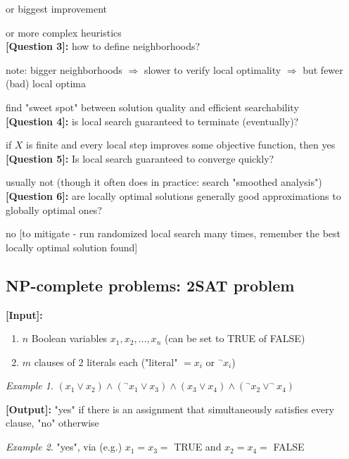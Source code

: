 \documentclass[a4paper,12pt]{article}
\theoremstyle{plain}
\theoremstyle{definition}
\theoremstyle{remark}
\newtheorem*{example}{Example}
\begin{document}
or biggest improvement

or more complex heuristics
\\

\textbf{[Question 3]:} how to define neighborhoods?

note: bigger neighborhoods $\Rightarrow$ slower to verify local optimality $\Rightarrow$ but fewer (bad) local optima

find "sweet spot" between solution quality and efficient searchability
\\

\textbf{[Question 4]:} is local search guaranteed to terminate (eventually)?

if $X$ is finite and every local step improves some objective function, then yes
\\

\textbf{[Question 5]:} Is local search guaranteed to converge quickly?

usually not (though it often does in practice: search "smoothed analysis")
\\

\textbf{[Question 6]:} are locally optimal solutions generally good approximations to globally optimal ones?

no [to mitigate - run randomized local search many times, remember the best locally optimal solution found]



\subsection{NP-complete problems: 2SAT problem}
\textbf{[Input]:}
\begin{enumerate}
	\item $n$ Boolean variables $x_1, x_2, \dots, x_n$ (can be set to TRUE of FALSE)
	\item $m$ clauses of $2$ literals each ("literal" $= x_i$ or $^\neg x_i$)
\end{enumerate}

\begin{example} $(x_1 \vee x_2) \wedge (^\neg x_1 \vee x_3) \wedge (x_3 \vee x_4) \wedge (^\neg x_2 \vee ^\neg x_4)$\end{example}

\textbf{[Output]:} "yes" if there is an assignment that simultaneously satisfies every clause, "no" otherwise

\begin{example}"yes", via (e.g.) $x_1 = x_3 =$ TRUE and $x_2 = x_4 =$ FALSE\\\end{example}
\end{document}
